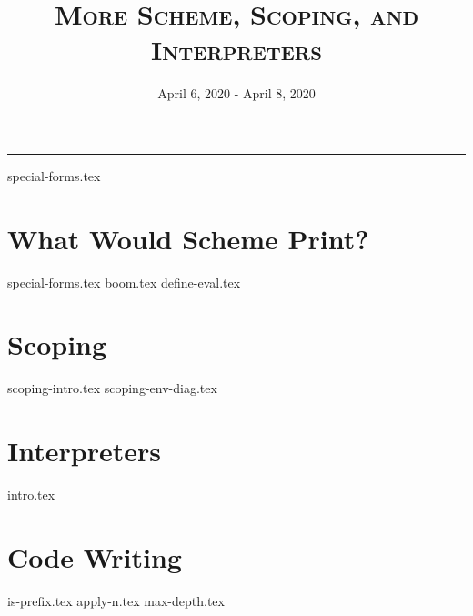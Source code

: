 \documentclass{exam}
\title{\textsc{More Scheme, Scoping, and Interpreters}}
\date{April 6, 2020 - April 8, 2020}
\begin{document}
\maketitle
\rule{\textwidth}{0.15em}
\fontsize{12}{15}\selectfont

{special-forms.tex}
\section{What Would Scheme Print?}
\begin{questions}
{special-forms.tex}
{boom.tex}
{define-eval.tex}
\end{questions}

\section{Scoping}
\begin{questions}
{scoping-intro.tex}
{scoping-env-diag.tex}
\end{questions}

\section{Interpreters}
\begin{questions}
{intro.tex}
\end{questions}

\section{Code Writing}
\begin{questions}
{is-prefix.tex}
{apply-n.tex}
{max-depth.tex}
\end{questions}
\end{document}
